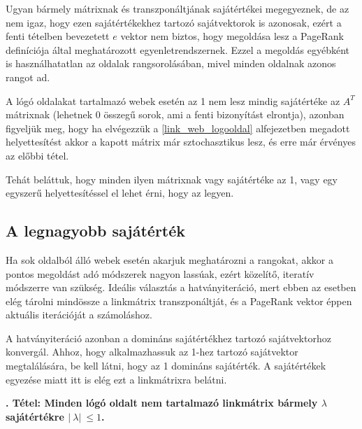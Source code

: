 \documentclass[12pt,a4paper]{article}
\newcounter{tszam}
\newenvironment{tetel}[1]
{{\medskip}\noindent \stepcounter{tszam}
{\bfseries{\thetszam. Tétel: #1\\[1ex]}}}{\bigskip }
\begin{document}
Ugyan bármely mátrixnak és transzponáltjának sajátértékei megegyeznek, de az nem igaz, hogy ezen sajátértékekhez tartozó sajátvektorok is azonosak, ezért a fenti tételben bevezetett $e$ vektor nem biztos, hogy megoldása lesz a PageRank definíciója által meghatározott egyenletrendszernek. Ezzel a megoldás egyébként is használhatatlan az oldalak rangsorolásában, mivel minden oldalnak azonos rangot ad.

A lógó oldalakat tartalmazó webek esetén az 1 nem lesz mindig sajátértéke az $A^T$ mátrixnak (lehetnek 0 összegű sorok, ami a fenti bizonyítást elrontja), azonban figyeljük meg, hogy ha elvégezzük a \ref{link_web_logooldal} alfejezetben megadott helyettesítést akkor a kapott mátrix már sztochasztikus lesz, és erre már érvényes az előbbi tétel.

Tehát beláttuk, hogy minden ilyen mátrixnak vagy sajátértéke az 1, vagy egy egyszerű helyettesítéssel el lehet érni, hogy az legyen. 

\subsection{A legnagyobb sajátérték}\label{legnagyobb_sajatertek}

Ha sok oldalból álló webek esetén akarjuk meghatározni a rangokat, akkor a pontos megoldást adó módszerek nagyon lassúak, ezért közelítő, iteratív módszerre van szükség. Ideális választás a hatványiteráció, mert ebben az esetben elég tárolni mindössze a linkmátrix transzponáltját, és a PageRank vektor éppen aktuális iterációját a számoláshoz.

A hatványiteráció azonban a domináns sajátértékhez tartozó sajátvektorhoz konvergál. Ahhoz, hogy alkalmazhassuk az 1-hez tartozó sajátvektor megtalálására, be kell látni, hogy az 1 domináns sajátérték. A sajátértékek egyezése miatt itt is elég ezt a linkmátrixra belátni.

\begin{tetel}{Minden lógó oldalt nem tartalmazó linkmátrix bármely $\lambda$ sajátértékre $ |\ \lambda |\ \leq 1$.}
\end{tetel}
\end{document}
